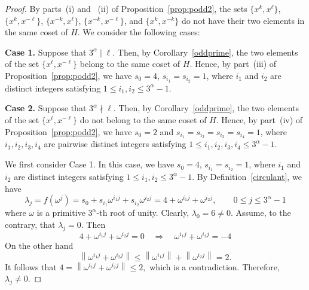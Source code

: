 \documentclass[12pt]{article}
\begin{document}
\begin{proof}
 By parts~(i) and ~(ii)  of Proposition~\ref{prop:podd2}, the sets $\{x^k,x^\ell\}$, $\{x^k,x^{-\ell}\}$, $\{x^{-k},x^{\ell}\}$, $\{x^{-k},x^{-\ell}\}$, and $\{x^{k},x^{-k}\}$  do not have their two elements in the same coset of $H$. We consider the following cases:

 \textbf{Case 1.}  Suppose that $3^\alpha\mid \ell$. Then, by  Corollary~\ref{oddprime}, the two elements of the set $\{x^\ell,x^{-\ell}\}$ belong to the same coset of $H$. Hence, by part~(iii) of Proposition~\ref{prop:podd2}, we have $s_0=4$, $s_{i_1}=s_{i_2}=1$, where $i_1$ and $i_2$ are distinct integers satisfying $1\le i_1,i_2\le 3^\alpha-1$.

 \textbf{Case 2.} Suppose that $3^\alpha\nmid \ell$. Then, by Corollary~\ref{oddprime}, the two elements of the set $\{x^\ell,x^{-\ell}\}$ do not belong to the same coset of $H$. Hence, by part~(iv) of Proposition~\ref{prop:podd2}, we have $s_0=2$ and $s_{i_1}=s_{i_2}=s_{i_3}=s_{i_4}=1$, where $i_1,i_2,i_3,i_4$ are pairwise distinct integers satisfying $1\le i_1,i_2,i_3,i_4\le 3^\alpha-1$.

 We first consider Case 1. In this case, we have $s_0=4$, $s_{i_1}=s_{i_2}=1$, where $i_1$ and $i_2$ are distinct integers satisfying $1\le i_1,i_2\le 3^\alpha-1$. By Definition~\ref{circulant}, we have
 \[
 \lambda_j=f(\omega^j)
 =s_0+s_{i_1}\omega^{i_1j}+s_{i_2}\omega^{i_2j}
 =4+\omega^{i_1j}+\omega^{i_2j},
 \qquad
 0\le j\le 3^{\alpha}-1
 \]
 where $\omega$ is a primitive $3^{\alpha}$-th root of unity. Clearly, $\lambda_0=6\neq0.$ Assume, to the contrary, that $\lambda_j=0$. Then
 \[
 4+\omega^{i_1j}+\omega^{i_2j}=0
 \quad\Longrightarrow\quad
 \omega^{i_1j}+\omega^{i_2j}=-4
 \]
 On the other hand
 \[
 \left\|\omega^{i_1j}+\omega^{i_2j}\right\|
 \le
 \left\|\omega^{i_1j}\right\|
 +
 \left\|\omega^{i_2j}\right\|
 =2.
 \]
 It follows that
 $
 4=\left\|\omega^{i_1j}+\omega^{i_2j}\right\|\le2,
 $
 which is a contradiction. Therefore,
 $
 \lambda_j\neq0.
 $


\end{proof}
\end{document}
